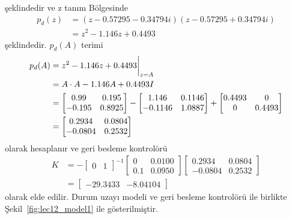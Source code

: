 şeklindedir ve z tanım Bölgesinde
\begin{equation}
    \begin{split}
        p_d(z)&=(z-0.57295-0.34794i)(z-0.57295+0.34794i)\\
        &=z^2 - 1.146z + 0.4493
    \end{split}
\end{equation}
şeklindedir. $p_d(A)$ terimi
\begin{equation}
    \begin{split}
        p_d(A)&=z^2 - 1.146z + 0.4493\bigg{|}_{z=A}\\
        &=A\cdot A - 1.146A + 0.4493I\\
        &=\begin{bmatrix} 0.99&0.195\\-0.195& 0.8925\end{bmatrix}-
        \begin{bmatrix}1.146&0.1146\\-0.1146&1.0887\end{bmatrix}+
        \begin{bmatrix}0.4493&0\\0&0.4493\end{bmatrix}\\
        &=\begin{bmatrix}0.2934&0.0804\\-0.0804&0.2532\end{bmatrix} 
    \end{split}
\end{equation}
olarak hesaplanır ve geri besleme kontrolörü
\begin{equation}
    \begin{split}
        K&=-\begin{bmatrix}0&1\end{bmatrix}^{-1}\begin{bmatrix}0& 0.0100\\0.1& 0.0950\end{bmatrix} \begin{bmatrix}0.2934&0.0804\\-0.0804&0.2532\end{bmatrix} \\
        &=\begin{bmatrix}-29.3433& -8.04104\end{bmatrix} 
    \end{split}
\end{equation}
olarak elde edilir. Durum uzayı modeli ve geri besleme kontrolörü ile birlikte Şekil~\ref{fig:lec12_model1} ile gösterilmiştir. 

